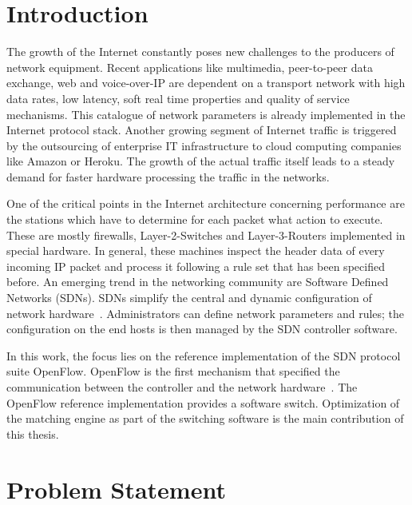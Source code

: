 \documentclass[conference]{IEEEtran}
\begin{document}
\section{Introduction}
\label{sec:intro}
The growth of the Internet constantly poses new challenges to the producers of network equipment.
Recent applications like multimedia, peer-to-peer data exchange, web and voice-over-IP are dependent on a transport network with
high data rates, low latency, soft real time properties and quality of service mechanisms.
This catalogue of network parameters is already implemented in the Internet protocol stack.
Another growing segment of Internet traffic is triggered by the outsourcing of 
enterprise IT infrastructure to cloud computing companies like Amazon or Heroku.
The growth of the actual traffic itself leads to a steady demand for faster hardware processing the traffic in the networks.

One of the critical points in the Internet architecture concerning performance 
are the stations which have to determine for each packet what action to execute.
These are mostly firewalls, Layer-2-Switches and Layer-3-Routers implemented in special hardware.
In general, these machines inspect the header data of every incoming IP packet and process it 
following a rule set that has been specified before.
An emerging trend in the networking community are Software Defined Networks (SDNs).
SDNs simplify the central and dynamic configuration of network hardware~\cite{onf_whitepaper}.
Administrators can define network parameters and rules; the configuration 
on the end hosts is then managed by the SDN controller software.

In this work, the focus lies on the reference implementation of the SDN protocol suite OpenFlow.
OpenFlow is the first mechanism that specified the communication between the controller and the network hardware~\cite{onf_whitepaper}.
The OpenFlow reference implementation provides a software switch.
Optimization of the matching engine as part of the switching software is the main contribution of this thesis.

\section{Problem Statement}
\end{document}
